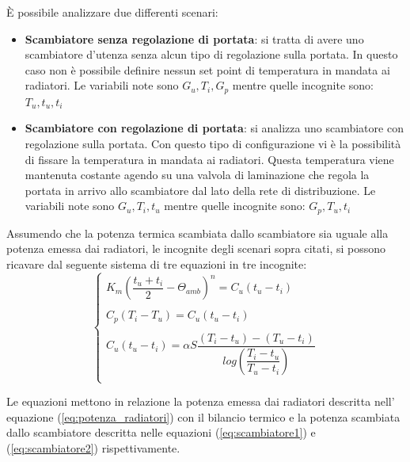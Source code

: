 \documentclass[laurea,oneside,11pt]{USiena_tesiLM}
\begin{document}
\`E possibile analizzare due differenti scenari:
\begin{itemize}
\item \textbf{Scambiatore senza regolazione di portata}: si tratta di avere uno scambiatore d'utenza senza alcun tipo di regolazione sulla portata. In questo caso non è possibile definire nessun set point di temperatura in mandata ai radiatori. Le variabili note sono $G_u, T_i, G_p$ mentre quelle incognite sono: $T_u, t_u, t_i$

\item \textbf{Scambiatore con regolazione di portata}: si analizza uno scambiatore con regolazione sulla portata. Con questo tipo di configurazione vi è la possibilità di fissare la temperatura in mandata ai radiatori. Questa temperatura viene mantenuta costante agendo su una valvola di laminazione che regola la portata in arrivo allo scambiatore dal lato della rete di distribuzione.   Le  variabili note sono $G_u, T_i, t_u$ mentre quelle incognite sono: $G_p, T_u, t_i$
\end{itemize}
Assumendo che la potenza termica scambiata dallo scambiatore sia uguale alla potenza emessa dai radiatori, le incognite degli scenari sopra citati, si possono ricavare dal seguente sistema di  tre equazioni in tre incognite: 
\begin{equation}
\left \{
\begin{array}{rl}
K_m(\dfrac{t_u + t_i}{2} - \Theta_{amb})^n = C_u(t_u - t_i)\\
\\
C_p(T_i - T_u) = C_u(t_u - t_i)\\
\\
C_u(t_u - t_i) = \alpha S \dfrac{(T_i - t_u)-(T_u - t_i )}{log\left( \dfrac{T_i - t_u}{T_u - t_i } \right)}\\
\end{array}
\right.
\end{equation}

Le equazioni mettono in relazione la potenza emessa dai radiatori descritta nell' equazione (\ref{eq:potenza_radiatori}) con il bilancio termico e la potenza scambiata dallo scambiatore descritta nelle equazioni (\ref{eq:scambiatore1}) e (\ref{eq:scambiatore2}) rispettivamente.
\end{document}
